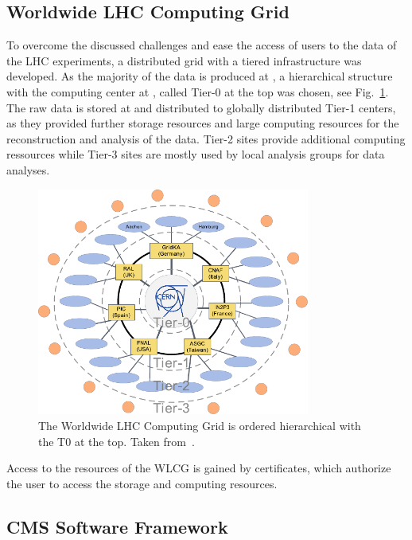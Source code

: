 \subsection{Worldwide LHC Computing Grid}

To overcome the discussed challenges and ease the access of users to the data of
the LHC experiments, a distributed grid with a tiered infrastructure was
developed. As the majority of the data is produced at \CERN, a hierarchical
structure with the computing center at \CERN, called Tier-0 at the top was
chosen, see Fig.~\ref{fig:lhc_tier_structure}. The raw data is stored at \CERN
and distributed to globally distributed Tier-1 centers, as they provided further
storage resources and large computing resources for the reconstruction and
analysis of the data. Tier-2 sites provide additional computing ressources while
Tier-3 sites are mostly used by local analysis groups for data analyses.

\begin{figure}[htp]
    \centering
    \includegraphics[width=0.8\textwidth]{figures/cms_detector/lhcg.pdf}\hfill
    \caption[Tiered structure of the worldwide LHC Computing Grid]{The Worldwide
        LHC Computing Grid is ordered hierarchical with the \CERN T0 at the top. Taken
        from~\cite{Stober:2012abc}.}
    \label{fig:lhc_tier_structure}
\end{figure}

Access to the resources of the WLCG is gained by certificates, which authorize
the user to access the storage and computing resources.


\subsection{CMS Software Framework}

